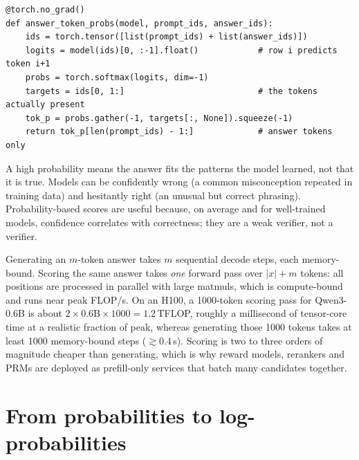 \begin{lstlisting}[caption={Per-token probabilities of an answer by teacher forcing.},label={lst:refine:tokprob}]
@torch.no_grad()
def answer_token_probs(model, prompt_ids, answer_ids):
    ids = torch.tensor([list(prompt_ids) + list(answer_ids)])
    logits = model(ids)[0, :-1].float()            # row i predicts token i+1
    probs = torch.softmax(logits, dim=-1)
    targets = ids[0, 1:]                           # the tokens actually present
    tok_p = probs.gather(-1, targets[:, None]).squeeze(-1)
    return tok_p[len(prompt_ids) - 1:]             # answer tokens only
\end{lstlisting}

\begin{keyidea}
A high probability means the answer fits the patterns the model learned, not that it is true. Models
can be confidently wrong (a common misconception repeated in training data) and hesitantly right
(an unusual but correct phrasing). Probability-based scores are useful because, on average and for
well-trained models, confidence correlates with correctness; they are a weak verifier, not a
verifier.
\end{keyidea}

\begin{systemslens}
Generating an $m$-token answer takes $m$ sequential decode steps, each memory-bound. Scoring the same
answer takes \emph{one} forward pass over $|x| + m$ tokens: all positions are processed in parallel
with large matmuls, which is compute-bound and runs near peak FLOP/s. On an H100, a 1000-token
scoring pass for Qwen3-0.6B is about $2 \times 0.6\text{B} \times 1000 = 1.2$\,TFLOP, roughly a
millisecond of tensor-core time at a realistic fraction of peak, whereas generating those 1000 tokens
takes at least 1000 memory-bound steps ($\gtrsim 0.4$\,s). Scoring is two to three orders of magnitude
cheaper than generating, which is why reward models, rerankers and PRMs are deployed as prefill-only
services that batch many candidates together.
\end{systemslens}

\section{From probabilities to log-probabilities}\label{sec:refine:logprob}

